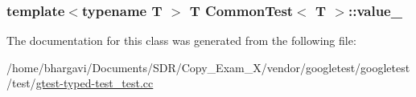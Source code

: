 \subsubsection[{\texorpdfstring{value\+\_\+}{value_}}]{\setlength{\rightskip}{0pt plus 5cm}template$<$typename T $>$ T {\bf Common\+Test}$<$ T $>$\+::value\+\_\+\hspace{0.3cm}{\ttfamily [protected]}}\hypertarget{class_common_test_ae59c4abcb833625a7baeb2048531ebec}{}\label{class_common_test_ae59c4abcb833625a7baeb2048531ebec}


The documentation for this class was generated from the following file\+:\begin{DoxyCompactItemize}
\item 
/home/bhargavi/\+Documents/\+S\+D\+R/\+Copy\+\_\+\+Exam\+\_\+X/vendor/googletest/googletest/test/\hyperlink{gtest-typed-test__test_8cc}{gtest-\/typed-\/test\+\_\+test.\+cc}\end{DoxyCompactItemize}
